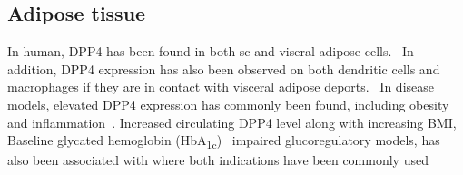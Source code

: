 \subsection{Adipose tissue}
In human, DPP4 has been found in both sc and viseral adipose cells.~\cite{Lamers2011} In addition, DPP4 expression has also been observed on both dendritic cells and macrophages if they are in contact with visceral adipose deports.~\cite{Zhong2013} In disease models, elevated DPP4 expression has commonly been found, including obesity and inflammation~\cite{Zhong2013}. Increased circulating DPP4 level along with increasing BMI, Baseline glycated hemoglobin (HbA\textsubscript{1c})~\cite{2011} impaired glucoregulatory models,  has also been associated with where both indications have been commonly used 